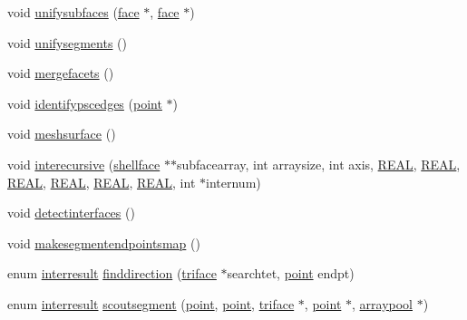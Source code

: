\begin{DoxyCompactItemize}
\item 
void \hyperlink{classtetgenmesh_afc39c975666d8787e07ad45a9d2e1e67}{unifysubfaces} (\hyperlink{classtetgenmesh_1_1face}{face} $\ast$, \hyperlink{classtetgenmesh_1_1face}{face} $\ast$)
\item 
void \hyperlink{classtetgenmesh_adcb0e0e582808c23829b42708a7596dc}{unifysegments} ()
\item 
void \hyperlink{classtetgenmesh_a5abff2e7fa8ae0632729d11f61c9f2a8}{mergefacets} ()
\item 
void \hyperlink{classtetgenmesh_a3193fcbef94cca623411966a3661f215}{identifypscedges} (\hyperlink{classtetgenmesh_ace3fb4f80389185b7c9b18ab69a3dea2}{point} $\ast$)
\item 
void \hyperlink{classtetgenmesh_a0c51cd3511d2b0ef9d0d45fe8b546b2e}{meshsurface} ()
\item 
void \hyperlink{classtetgenmesh_a46c5e7f1f3f94dd0c493f2b559671854}{interecursive} (\hyperlink{classtetgenmesh_ad4860123b88783b943fa6452e886a2cb}{shellface} $\ast$$\ast$subfacearray, int arraysize, int axis, \hyperlink{tetgen_8h_a4b654506f18b8bfd61ad2a29a7e38c25}{R\-E\-A\-L}, \hyperlink{tetgen_8h_a4b654506f18b8bfd61ad2a29a7e38c25}{R\-E\-A\-L}, \hyperlink{tetgen_8h_a4b654506f18b8bfd61ad2a29a7e38c25}{R\-E\-A\-L}, \hyperlink{tetgen_8h_a4b654506f18b8bfd61ad2a29a7e38c25}{R\-E\-A\-L}, \hyperlink{tetgen_8h_a4b654506f18b8bfd61ad2a29a7e38c25}{R\-E\-A\-L}, \hyperlink{tetgen_8h_a4b654506f18b8bfd61ad2a29a7e38c25}{R\-E\-A\-L}, int $\ast$internum)
\item 
void \hyperlink{classtetgenmesh_a854e8e8d77d2d1b2b74372a87a1a7717}{detectinterfaces} ()
\item 
void \hyperlink{classtetgenmesh_ac56b6a4bdcc053b5cc6afc005c8e1a69}{makesegmentendpointsmap} ()
\item 
enum \hyperlink{classtetgenmesh_a01d2be902350e1bf8f20e650d687a793}{interresult} \hyperlink{classtetgenmesh_a4a33553a18b0e9535d43d683b9473cbf}{finddirection} (\hyperlink{classtetgenmesh_1_1triface}{triface} $\ast$searchtet, \hyperlink{classtetgenmesh_ace3fb4f80389185b7c9b18ab69a3dea2}{point} endpt)
\item 
enum \hyperlink{classtetgenmesh_a01d2be902350e1bf8f20e650d687a793}{interresult} \hyperlink{classtetgenmesh_a92560ebc99b4555a560030efa62d2382}{scoutsegment} (\hyperlink{classtetgenmesh_ace3fb4f80389185b7c9b18ab69a3dea2}{point}, \hyperlink{classtetgenmesh_ace3fb4f80389185b7c9b18ab69a3dea2}{point}, \hyperlink{classtetgenmesh_1_1triface}{triface} $\ast$, \hyperlink{classtetgenmesh_ace3fb4f80389185b7c9b18ab69a3dea2}{point} $\ast$, \hyperlink{classtetgenmesh_1_1arraypool}{arraypool} $\ast$)
$$
\end{DoxyCompactItemize}
